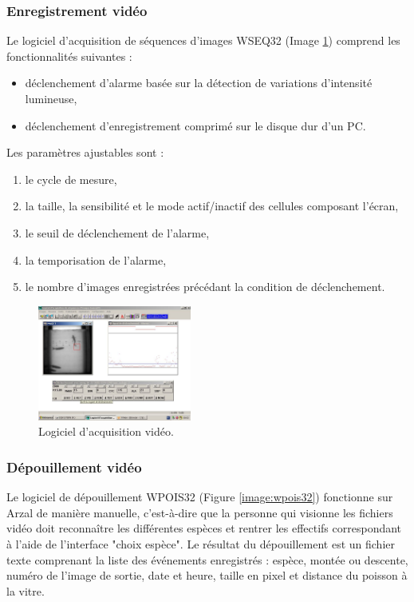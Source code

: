 \documentclass[11pt,twocolumn,titlepage,twoside]{article}\usepackage[]{graphicx}\usepackage[]{color}
\begin{document}
\subsubsection{Enregistrement vidéo}
Le logiciel d'acquisition de séquences d'images WSEQ32 (Image
\ref{image:wseq32}) comprend les fonctionnalités suivantes :
\begin{itemize}
\item	déclenchement d'alarme basée sur la détection de variations d'intensité
lumineuse,
\item	déclenchement d'enregistrement comprimé sur le disque dur d'un PC.
\end{itemize}
Les paramètres ajustables sont :
\begin{enumerate}
\item	le cycle de mesure,
\item   la taille, la sensibilité et le mode actif/inactif des cellules
composant l'écran, 
\item	le seuil de déclenchement de l'alarme,
\item	la temporisation de l’alarme,
\item	le nombre d’images enregistrées précédant la condition de déclenchement.
\end{enumerate}

\begin{figure}[htpb]
\centering
\includegraphics[width=0.45\textwidth]{wseq32.png}
\caption{Logiciel d’acquisition vidéo.
}
\label{image:wseq32}
\end{figure}

\subsubsection{Dépouillement vidéo}

Le logiciel de dépouillement WPOIS32 (Figure \ref{image:wpois32}) fonctionne sur Arzal de
manière manuelle, c'est-à-dire que la personne qui visionne les fichiers vidéo doit reconnaître
les différentes espèces et rentrer les effectifs correspondant à l’aide de l’interface "choix espèce".
Le résultat du dépouillement est un fichier texte comprenant la liste des événements enregistrés :
espèce, montée ou descente, numéro de l’image de sortie, date et heure, taille
en pixel et distance du poisson à la vitre.
\end{document}
